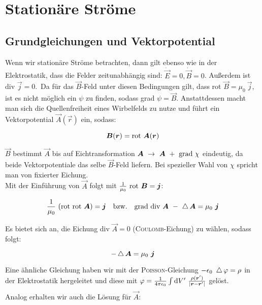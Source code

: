 \chapter{Stationäre Ströme}

\section{Grundgleichungen und Vektorpotential}

Wenn wir stationäre Ströme betrachten, dann gilt ebenso wie in der Elektrostatik, dass die Felder zeitunabhängig sind: $\dot{\vec{E}} = 0, \dot{\vec{B}}=0$. Außerdem ist div $\vec{j} = 0$.\
Da für das $\vec{B}$-Feld unter diesen Bedingungen gilt, dass rot $\vec{B} = \mu_0 \ \vec{j}$, ist es nicht möglich ein $\psi$ zu finden, sodass grad $\psi = \vec{B}$. Anstattdessen macht man sich die Quellenfreiheit eines Wirbelfelds zu nutze und führt ein Vektorpotential $\vec{A}(\vec{r})$ ein, sodass:

\begin{equation*}
\bm{B}(\bm{r}) = \text{rot } \bm{A}(\bm{r})
\end{equation*}

$\vec{B}$ bestimmt $\vec{A}$ bis auf Eichtransformation $\vec{A}\ \rightarrow \ \vec{A} \ + \ \grad \chi$ eindeutig, da beide Vektorpotentiale das selbe $\vec{B}$-Feld liefern. Bei spezieller Wahl von $\chi$ spricht man von fixierter Eichung.\\
Mit der Einführung von $\vec{A}$ folgt mit $\frac{1}{\mu_0}\ \text{rot } \bm{B} = \bm{j}$:

\begin{equation*}
\frac{1}{\mu_0}\ (\rot\rot\vec{A})=\vec{j} \quad \text{bzw.} \quad \grad\div \vec{A}\ - \ \laplace\vec{A}=\mu_0 \ \vec{j}
\end{equation*}

Es bietet sich an, die Eichung div $\vec{A} = 0$ (\textsc{Coulomb}-Eichung) zu wählen, sodass folgt:

\begin{equation*}
-\laplace\vec{A}=\mu_0 \ \vec{j}
\end{equation*}

Eine ähnliche Gleichung haben wir mit der \textsc{Poisson}-Gleichung $-\epsilon_0 \ \mathop{{}\bigtriangleup}\nolimits\varphi = \rho$ in der Elektrostatik hergeleitet und diese mit $\varphi = \frac{1}{4\pi\epsilon_0}\int\limits_{{}}^{{}}\mathrm{d}{V'}\ \frac{\rho(\bm{r}')}{|\bm{r}-\bm{r}'|}$ gelöst.\ \\
Analog erhalten wir auch die Lösung für $\vec{A}$:

